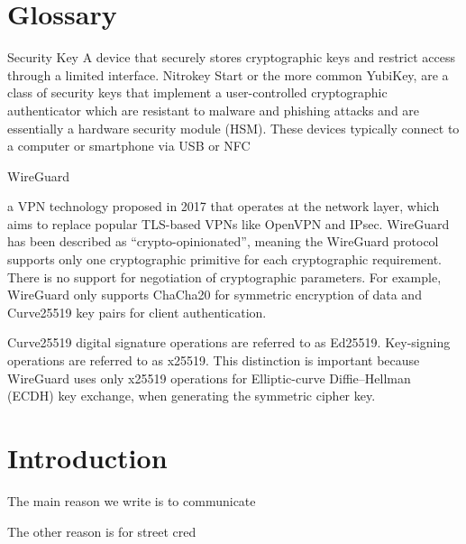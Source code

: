 \documentclass [11pt, proquest] {uwthesis}[2020/02/24]
\begin{document}
%
%
\tableofcontents
\listoffigures

\chapter*{Glossary}      %
\thispagestyle{plain}

\begin{glossary}

\item[Security Key]
A device that securely stores cryptographic keys and restrict access through a limited interface. 
Nitrokey Start\cite{noauthor_nitrokey_nodate} or the more common YubiKey\cite{noauthor_discover_nodate}\cite{noauthor_u2f_nodate-1}, are a class of security keys that implement a user-controlled 
cryptographic authenticator which are resistant to malware and phishing attacks and are essentially a hardware security module (HSM). 
These devices typically connect to a computer or smartphone via USB or NFC

\item[WireGuard]

a VPN technology proposed in 2017 that operates at the network layer, which aims to replace popular TLS-based VPNs like OpenVPN and IPsec.
WireGuard has been described as “crypto-opinionated”, meaning the WireGuard protocol supports only one cryptographic primitive for each cryptographic requirement.
There is no support for negotiation of cryptographic parameters. For example, WireGuard only supports ChaCha20 for symmetric 
encryption\cite{donenfeld_wireguard_2017} of data and Curve25519 key pairs for client authentication.

\item[Curve25519]
digital signature operations are referred to as Ed25519. Key-signing operations are referred to as x25519. 
This distinction is important because WireGuard uses only x25519 operations for Elliptic-curve Diffie–Hellman (ECDH) key exchange, 
when generating the symmetric cipher key.


\end{glossary}

\textpages

\chapter {Introduction}
The main reason we write is to communicate\

The other reason is for street cred
\end{document}
